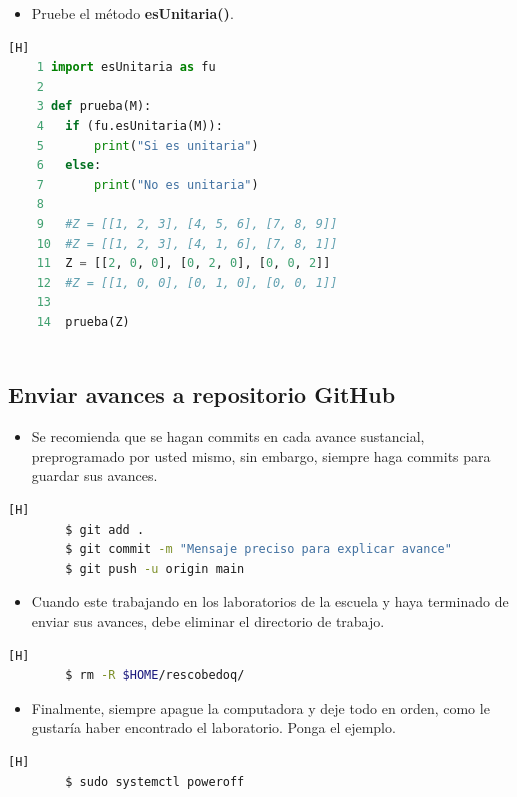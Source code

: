 \documentclass{article}
\begin{document}
	\begin{itemize}
		\item Pruebe el método \textbf{esUnitaria()}.
	\end{itemize}
	\begin{lstlisting}[language=python,caption={testEsUnitaria.py}][H]
	1 import esUnitaria as fu
	2
	3 def prueba(M):
	4 	if (fu.esUnitaria(M)):
	5 		print("Si es unitaria")
	6 	else:
	7 		print("No es unitaria")
	8
	9 	#Z = [[1, 2, 3], [4, 5, 6], [7, 8, 9]]
	10 	#Z = [[1, 2, 3], [4, 1, 6], [7, 8, 1]]
	11 	Z = [[2, 0, 0], [0, 2, 0], [0, 0, 2]]
	12 	#Z = [[1, 0, 0], [0, 1, 0], [0, 0, 1]]
	13
	14 	prueba(Z)
		
	\end{lstlisting}
	
	\subsection{Enviar avances a repositorio GitHub}
	\begin{itemize}
		\item Se recomienda que se hagan commits en cada avance sustancial, preprogramado por usted mismo, sin embargo, siempre haga commits para guardar sus avances.
	\end{itemize}
	\begin{lstlisting}[language=bash,caption={Enviar avances a repositorio GitHub}][H]
		$ git add .
		$ git commit -m "Mensaje preciso para explicar avance"
		$ git push -u origin main
	\end{lstlisting}
	
	\begin{itemize}
		\item Cuando este trabajando en los laboratorios de la escuela y haya terminado de enviar sus avances, debe eliminar el directorio de trabajo.
	\end{itemize}
	\begin{lstlisting}[language=bash,caption={Eliminar directorio de trabajo}][H]
		$ rm -R $HOME/rescobedoq/
	\end{lstlisting}
	
	\begin{itemize}
		\item Finalmente, siempre apague la computadora y deje todo en orden, como le gustaría haber encontrado el laboratorio. Ponga el ejemplo.
	\end{itemize}
	\begin{lstlisting}[language=bash,caption={Apagar Ubuntu GNU/Linux}][H]
		$ sudo systemctl poweroff
	\end{lstlisting}
	\clearpage	
	
\end{document}
